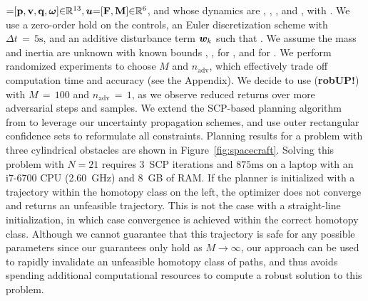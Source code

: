 \documentclass{article}
\begin{document}
\begin{minipage}{\linewidth}
    ${=}[\mathbf{p},\mathbf{v},\mathbf{q},\boldsymbol\omega]{\in}\mathbb{R}^{13},\bm{u}{=}[\mathbf{F},\mathbf{M}]{\in}\mathbb{R}^6$, and whose  dynamics are {\scalebox{0.98}{$\dot{\bpos} {=} \bv$}}, 
    {}, 
    {}, and {\scalebox{0.98}{$\bJ\dot{\bomega} {=} \bM {-} \bS(\bomega)\bJ\bomega$}}, with {} \citep{LewBonalli2020}. We use a zero-order hold on the controls, an Euler discretization scheme with $\Delta t \,{=}\, 5\mathrm{s}$, and an additive disturbance term $\bm{w}_k$ such that {}. We assume the mass and inertia are unknown with known bounds {}, {}, {} for {}, and {} for {}. 
    We perform randomized experiments to choose $M$ and $n_{\textrm{adv}}$, which effectively trade off computation time and accuracy (see the Appendix). 
    We decide to use (\textbf{robUP!}) with $M\,{=}\,100$ and $n_{\textrm{adv}}\,{=}\,1$, as we observe reduced returns over more adversarial steps and samples. We extend the SCP-based planning algorithm from \citep{LewBonalli2020} to leverage our uncertainty propagation schemes, and use outer rectangular confidence sets to reformulate all constraints. Planning results for a problem with three cylindrical obstacles are shown in Figure~\ref{fig:spacecraft}. Solving this problem with $N{=}21$ requires 3~SCP iterations and $875\mathrm{ms}$ on a laptop with an i7-6700 CPU (2.60~GHz) and 8~GB of RAM. If the planner is initialized with a trajectory within the homotopy class on the left, the optimizer does not converge and returns an unfeasible trajectory. This is not the case with a straight-line initialization, in which case convergence is achieved within the correct homotopy class. Although we cannot guarantee that this trajectory is safe for any possible parameters since our guarantees only hold as $M{\rightarrow}\infty$, our approach can be used to rapidly invalidate an unfeasible homotopy class of paths, and thus avoids spending additional computational resources to compute a robust solution to this problem. 
\end{minipage}



\end{document}

